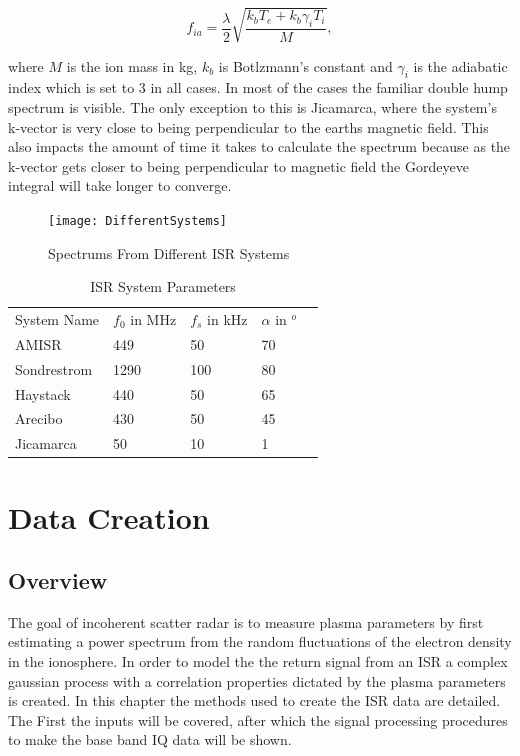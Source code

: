\documentclass[10pt]{report}
\begin{document}
\begin{equation}
\label{eq:iaf}
f_{ia} = \frac{\lambda}{2}\sqrt{\frac{k_bT_e +k_b\gamma_iT_i}{M}},
\end{equation}

\noindent where $M$ is the ion mass in kg, $k_b$ is Botlzmann's constant and $\gamma_i$ is the adiabatic index which is set to 3 in all cases. In most of the cases the familiar double hump spectrum is visible. The only exception to this is Jicamarca, where the system's k-vector is very close to being perpendicular to the earths magnetic field. This also impacts the amount of time it takes to calculate the spectrum because as the k-vector gets closer to being perpendicular to magnetic field the Gordeyeve integral will take longer to converge.
\begin{figure}[!h]
\centering
\texttt{[image: DifferentSystems]}

\caption{Spectrums From Different ISR Systems}
\label{fig:diffspectrums}
\end{figure}


\begin{table}[!h]
\centering
\caption{ISR System Parameters}
\label{tab:ISRsys}
\begin{tabular}{lllll}
System Name & $f_0$ in MHz & $f_s$ in kHz & $\alpha$ in $^o$ &  \\
AMISR       & 449          & 50           & 70               &  \\
Sondrestrom & 1290         & 100          & 80               &  \\
Haystack    & 440          & 50           & 65               &  \\
Arecibo     & 430          & 50           & 45               &  \\
Jicamarca   & 50           & 10           & 1                & 
\end{tabular}
\end{table}
\chapter{Data Creation}

\section*{Overview}
The goal of incoherent scatter radar is to measure plasma parameters by first estimating a power spectrum from the random fluctuations of the electron density in the ionosphere. In order to model the the return signal from an ISR a complex gaussian process with a correlation properties dictated by the plasma parameters is created. 
In this chapter the methods used to create the ISR data are detailed. The First the inputs will be covered, after which the signal processing procedures to make the base band IQ data will be shown.
\end{document}
